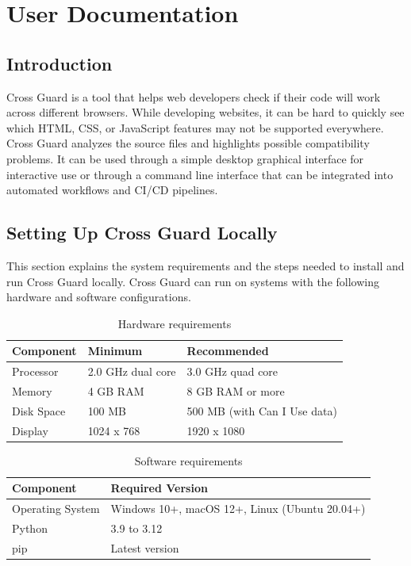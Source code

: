 \chapter{User Documentation}
\label{ch:user}

\section{Introduction}
\label{sec:user-intro}

Cross Guard is a tool that helps web developers check if their code will work across different browsers. While developing websites, it can be hard to quickly see which HTML, CSS, or JavaScript features may not be supported everywhere. Cross Guard analyzes the source files and highlights possible compatibility problems. It can be used through a simple desktop graphical interface for interactive use or through a command line interface that can be integrated into automated workflows and CI/CD pipelines.

\section{Setting Up Cross Guard Locally}
\label{sec:setup}

This section explains the system requirements and the steps needed to install and run Cross Guard locally. Cross Guard can run on systems with the following hardware and software configurations.

\begin{table}[H]
    \centering
    \begin{tabular}{|l|l|l|}
        \hline
        \textbf{Component} & \textbf{Minimum} & \textbf{Recommended} \\
        \hline \hline
        Processor   & 2.0 GHz dual core & 3.0 GHz quad core \\ \hline
        Memory      & 4 GB RAM          & 8 GB RAM or more \\ \hline
        Disk Space  & 100 MB            & 500 MB (with Can I Use data) \\ \hline
        Display     & 1024 x 768        & 1920 x 1080 \\ \hline
    \end{tabular}
    \caption{Hardware requirements}
    \label{tab:hardware-req}
\end{table}

\begin{table}[H]
    \centering
    \begin{tabular}{|l|l|}
        \hline
        \textbf{Component} & \textbf{Required Version} \\
        \hline \hline
        Operating System & Windows 10+, macOS 12+, Linux (Ubuntu 20.04+) \\ \hline
        Python           & 3.9 to 3.12 \\ \hline
        pip              & Latest version \\ \hline
    \end{tabular}
    \caption{Software requirements}
    \label{tab:software-req}
\end{table}

